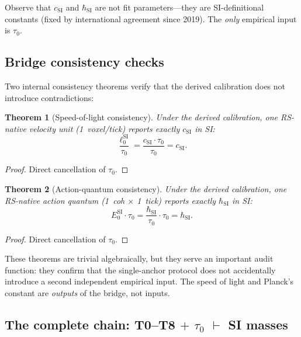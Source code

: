 \documentclass[11pt,a4paper]{article}
\newtheorem{theorem}{Theorem}[section]
\theoremstyle{definition}
\theoremstyle{remark}
\begin{document}
\noindent
Observe that $c_{\mathrm{SI}}$ and $\hbar_{\mathrm{SI}}$ are not fit
parameters---they are SI-definitional constants (fixed by international
agreement since 2019).  The \emph{only} empirical input is $\tau_0$.

\subsection{Bridge consistency checks}

Two internal consistency theorems verify that the derived calibration does
not introduce contradictions:

\begin{theorem}[Speed-of-light consistency]
\label{thm:c_check}
Under the derived calibration, one RS-native velocity unit (1~voxel/tick)
reports exactly $c_{\mathrm{SI}}$ in SI:
\begin{equation}
  \frac{\ell_0^{\mathrm{SI}}}{\tau_0}
  = \frac{c_{\mathrm{SI}} \cdot \tau_0}{\tau_0}
  = c_{\mathrm{SI}}.
  \label{eq:c_check}
\end{equation}
\end{theorem}

\begin{proof}
Direct cancellation of $\tau_0$.
\end{proof}

\begin{theorem}[Action-quantum consistency]
\label{thm:hbar_check}
Under the derived calibration, one RS-native action quantum (1~coh $\times$
1~tick) reports exactly $\hbar_{\mathrm{SI}}$ in SI:
\begin{equation}
  E_0^{\mathrm{SI}} \cdot \tau_0
  = \frac{\hbar_{\mathrm{SI}}}{\tau_0} \cdot \tau_0
  = \hbar_{\mathrm{SI}}.
  \label{eq:hbar_check}
\end{equation}
\end{theorem}

\begin{proof}
Direct cancellation of $\tau_0$.
\end{proof}

\noindent
These theorems are trivial algebraically, but they serve an important audit
function: they confirm that the single-anchor protocol does not accidentally
introduce a second independent empirical input.  The speed of light and
Planck's constant are \emph{outputs} of the bridge, not inputs.

\subsection{The complete chain: T0--T8 $+$ $\tau_0$ $\vdash$ SI masses}
\end{document}
